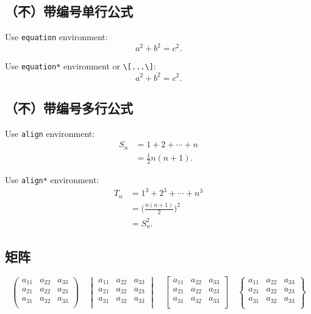 \subsection{（不）带编号单行公式}

Use \texttt{equation} environment:
\begin{equation}
  a^2 + b^2 = c^2.
\end{equation}

Use \texttt{equation*} environment or \texttt{\textbackslash[...\textbackslash]}:
\[ a^2 + b^2 = c^2.\]

\subsection{（不）带编号多行公式}

Use \texttt{align} environment:
\begin{align}
  S_n & = 1 + 2 + \cdots + n \\
      & = \frac12 n(n+1).
\end{align}

Use \texttt{align*} environment:
\begin{align*}
  T_n & = 1^3 + 2^3 + \cdots + n^3 \\
      & = \biggl(\frac{n(n+1)}{2}\biggr)^2 \\
      & = S_n^2.
\end{align*}

\subsection{矩阵}

\[\begin{pmatrix}
  a_{11} & a_{22} & a_{33} \\
  a_{21} & a_{22} & a_{23} \\
  a_{31} & a_{32} & a_{33} \\
\end{pmatrix} \quad
\begin{vmatrix}
  a_{11} & a_{22} & a_{33} \\
  a_{21} & a_{22} & a_{23} \\
  a_{31} & a_{32} & a_{33} \\
\end{vmatrix} \quad
\begin{bmatrix}
  a_{11} & a_{22} & a_{33} \\
  a_{21} & a_{22} & a_{23} \\
  a_{31} & a_{32} & a_{33} \\
\end{bmatrix} \quad
\begin{Bmatrix}
  a_{11} & a_{22} & a_{33} \\
  a_{21} & a_{22} & a_{23} \\
  a_{31} & a_{32} & a_{33} \\
\end{Bmatrix}\]

